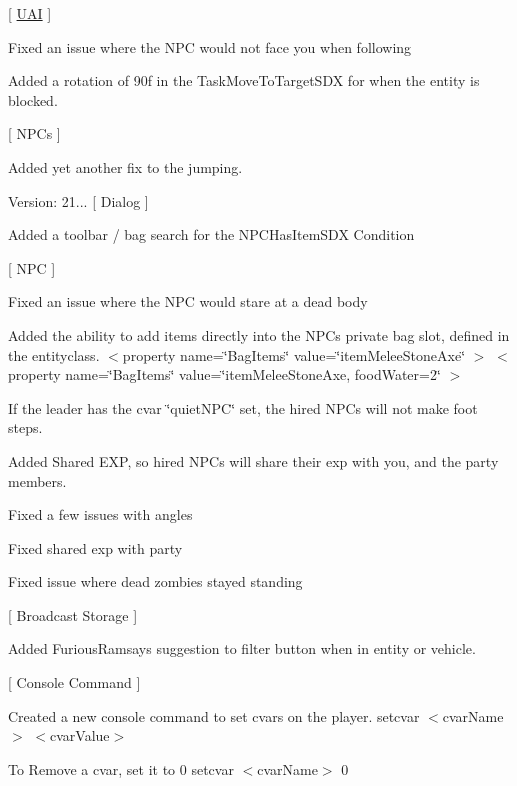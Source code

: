 \mbox{[} \mbox{\hyperlink{namespace_u_a_i}{UAI}} \mbox{]}
\begin{DoxyItemize}
\item Fixed an issue where the NPC would not face you when following
\item Added a rotation of 90f in the Task\+Move\+To\+Target\+SDX for when the entity is blocked.
\end{DoxyItemize}

\mbox{[} NPCs \mbox{]}
\begin{DoxyItemize}
\item Added yet another fix to the jumping.
\end{DoxyItemize}

Version\+: 21... \mbox{[} Dialog \mbox{]}
\begin{DoxyItemize}
\item Added a toolbar / bag search for the NPCHas\+Item\+SDX Condition
\end{DoxyItemize}

\mbox{[} NPC \mbox{]}
\begin{DoxyItemize}
\item Fixed an issue where the NPC would stare at a dead body
\item Added the ability to add items directly into the NPC\textquotesingle{}s private bag slot, defined in the entityclass. $<$property name=\char`\"{}\+Bag\+Items\char`\"{} value=\char`\"{}item\+Melee\+Stone\+Axe\char`\"{} $>$ $<$property name=\char`\"{}\+Bag\+Items\char`\"{} value=\char`\"{}item\+Melee\+Stone\+Axe, food\+Water=2\char`\"{} $>$
\item If the leader has the cvar \char`\"{}quiet\+NPC\char`\"{} set, the hired NPCs will not make foot steps.
\item Added Shared EXP, so hired NPCs will share their exp with you, and the party members.
\item Fixed a few issues with angles
\item Fixed shared exp with party
\item Fixed issue where dead zombies stayed standing
\end{DoxyItemize}

\mbox{[} Broadcast Storage \mbox{]}
\begin{DoxyItemize}
\item Added Furious\+Ramsay\textquotesingle{}s suggestion to filter button when in entity or vehicle.
\end{DoxyItemize}

\mbox{[} Console Command \mbox{]}
\begin{DoxyItemize}
\item Created a new console command to set cvar\textquotesingle{}s on the player. setcvar $<$cvar\+Name$>$ $<$cvar\+Value$>$
\item To Remove a cvar, set it to 0 setcvar $<$cvar\+Name$>$ 0 ~\newline

\end{DoxyItemize}

